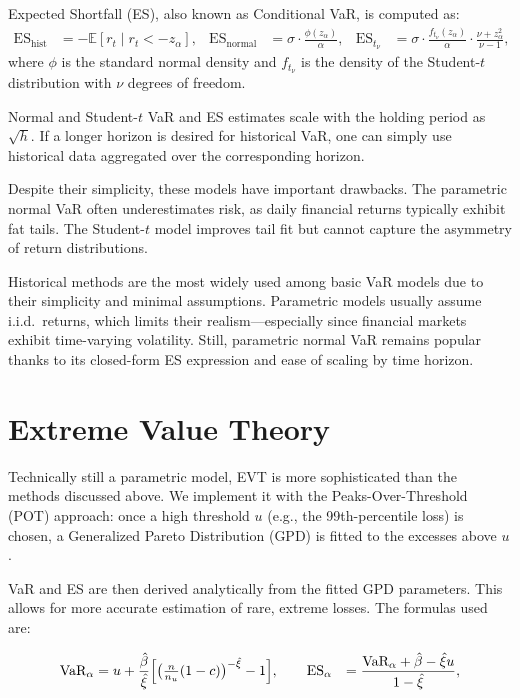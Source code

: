 \documentclass[12pt]{article}
\begin{document}
Expected Shortfall (ES), also known as Conditional VaR, is computed as:
\[
\begin{aligned}
\mathrm{ES}_{\mathrm{hist}} &= -\mathbb{E}\left[r_t \mid r_t < -z_{\alpha}\right], &
\mathrm{ES}_{\mathrm{normal}} &= \sigma \cdot \frac{\phi(z_{\alpha})}{\alpha}, &
\mathrm{ES}_{t_\nu} &= \sigma \cdot \frac{f_{t_\nu}(z_{\alpha})}{\alpha} \cdot \frac{\nu + z_{\alpha}^2}{\nu - 1},
\end{aligned}
\]
where $\phi$ is the standard normal density and $f_{t_\nu}$ is the density of the Student-$t$ distribution with $\nu$ degrees of freedom.

Normal and Student-$t$ VaR and ES estimates scale with the holding period as $\sqrt{h}$. If a longer horizon is desired for historical VaR, one can simply use historical data aggregated over the corresponding horizon.

Despite their simplicity, these models have important drawbacks. The parametric normal VaR often underestimates risk, as daily financial returns typically exhibit fat tails. The Student-$t$ model improves tail fit but cannot capture the asymmetry of return distributions. 

Historical methods are the most widely used among basic VaR models due to their simplicity and minimal assumptions. Parametric models usually assume i.i.d.\ returns, which limits their realism—especially since financial markets exhibit time-varying volatility. Still, parametric normal VaR remains popular thanks to its closed-form ES expression and ease of scaling by time horizon.



\section{Extreme Value Theory}

Technically still a parametric model, EVT is more sophisticated than the methods discussed above. We implement it with the Peaks-Over-Threshold (POT) approach: once a high threshold $u$ (e.g., the 99th-percentile loss) is chosen, a Generalized Pareto Distribution (GPD) is fitted to the excesses above $u$. 

VaR and ES are then derived analytically from the fitted GPD parameters. This allows for more accurate estimation of rare, extreme losses. The formulas used are:

\[
\begin{aligned}
{\text{VaR}}_\alpha &= u + \frac{\hat{\beta}}{\hat{\xi}}
\Bigl[\bigl(\tfrac{n}{n_u}(1-c)\bigr)^{-\hat{\xi}} - 1\Bigr],\qquad
{\text{ES}}_\alpha &= \frac{{\text{VaR}}_\alpha + \hat{\beta} - \hat{\xi} u}{1 - \hat{\xi}},
\end{aligned}
\]
\end{document}
